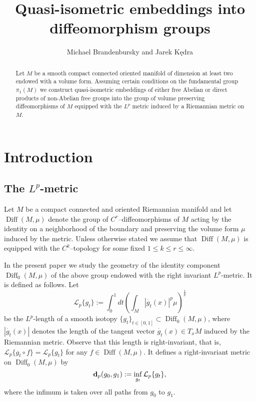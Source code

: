 \documentclass[a4paper,12pt]{amsart}
\def\Diff{\operatorname{Diff}}
\theoremstyle{definition}
\begin{document}
\title[Quasi-isometric embeddings]{Quasi-isometric embeddings into diffeomorphism groups}

\author{Michael Brandenbursky and Jarek K\k{e}dra}


\begin{abstract}
Let $M$ be a smooth compact connected oriented manifold of dimension at least
two endowed with a volume form. Assuming certain conditions on the
fundamental group $\pi_1(M)$ we construct quasi-isometric embeddings of
either free Abelian or direct products of non-Abelian free groups into
the group of volume preserving diffeomorphisms of $M$ equipped with
the $L^p$ metric induced by a Riemannian metric on $M$.


\end{abstract}

\maketitle

\section{Introduction}

\subsection{The $L^p$-metric}
Let $M$ be a compact connected and oriented Riemannian manifold and
let $\Diff(M,\mu)$ denote the group of $C^r$--diffeo\-mor\-phisms of
$M$ acting by the identity on a neighborhood of the boundary and
preserving the volume form $\mu$ induced by the metric.
Unless otherwise stated we assume that $\Diff(M,\mu)$ is
equipped with the $C^{k}$--topology for some fixed
$1\leq k\leq r\leq \infty$.

In the present paper we study the geometry of the identity component
$\Diff_0(M,\mu)$ of the above group endowed with the right
invariant $L^p$-metric. It is defined as follows. Let
$$
\mathcal{L}_p\{g_t\}:=
\int_0^1 dt \left(\int_M|\dot{g_t}(x)|^p\mu \right)^{\frac 1p}
$$
be the $L^p$-length
of a smooth isotopy $\{g_t\}_{t\in [0,1]}\subset\Diff_0(M,\mu)$,
where $|\dot{g_t}(x)|$ denotes the length of the tangent
vector $\dot{g_t}(x)\in T_xM$ induced by the Riemannian
metric. Observe that this length is right-invariant, that is,
$\mathcal{L}_p\{g_t\circ f\}=\mathcal{L}_p\{g_t\}$
for any $f\in \Diff(M,\mu)$. It defines a right-invariant
metric on $\Diff_0(M,\mu)$ by
$$
{\bf d}_p(g_0,g_1):=\inf_{g_t}\mathcal{L}_{p}\{g_t\},
$$
where the infimum is taken over all paths from
$g_0$ to $g_1$.
\end{document}
